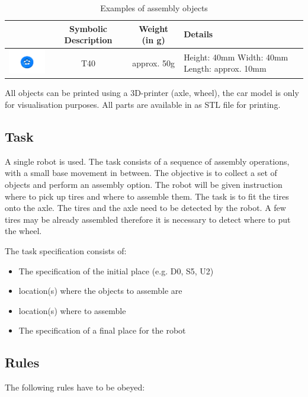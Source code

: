 \begin{table}[p]
\begin{tabular}{|c|c|c|p{5cm}|}
\hline 
 & Symbolic Description & Weight (in g) & Details \\ 
\hline 
\includegraphics[width=3cm]{./images/BAT_Tire.png}  & T40 & approx. 50g & Height: 40mm \newline
 Width: 40mm \newline
 Length: approx. 10mm \\ 
\hline 
\end{tabular} 

\label{tab:bat_objects}
\caption{Examples of assembly objects}
\end{table}

All objects can be printed using a 3D-printer (axle, wheel), the car model is only for visualisation purposes. All parts are available in as STL file for printing.

\subsection{Task}
A single robot is used. The task consists of a sequence of assembly operations, with a small base movement in between. The objective is to collect a set of objects and perform an assembly option. The robot will be given instruction where to pick up tires and where to assemble them. The task is to fit the tires onto the axle. The tires and the axle need to be detected by the robot. A few tires may be already assembled therefore it is necessary to detect where to put the wheel.

\par
The task specification consists of: 
\begin{itemize}
	\item The specification of the initial place (e.g. D0, S5, U2)
	\item location(s) where the objects to assemble are
	\item location(s) where to assemble
	\item The specification of a final place for the robot 
\end{itemize}

\subsection{Rules}
The following rules have to be obeyed:

